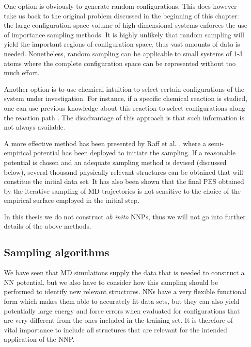 \documentclass[twoside,english]{uiofysmaster}
\begin{document}
One option is obviously to generate random configurations. This does however take us back to the 
original problem discussed in the beginning of this chapter: the large configuration space volume of
high-dimensional systems enforces the use of importance sampling methods. 
It is highly unlikely that random sampling will yield the important regions of configuration space, thus 
vast amounts of data is needed. Nonetheless, random sampling can be applicable to small systems of 1-3 atoms where
the complete configuration space can be represented without too much effort. 

Another option is to use chemical intuition to select certain configurations of 
the system under investigation. 
For instance, if a specific chemical reaction is studied, one can use previous knowledge about this reaction to 
select configurations along the reaction path \cite{Ischtwan94}. The disadvantage of this approach is that
such information is not always available. 

A more effective method has been presented by Raff et al. \cite{Raff05}, where a semi-empirical
potential has been deployed to initiate the sampling. If a reasonable potential is chosen and an adequate
sampling method is devised (discussed below), several thousand physically relevant structures can be obtained
that will constitue the initial data set. It has also been shown \cite{Raff05} that the final PES obtained 
by the iterative sampling of MD trajectories is not sensitive to the choice of the empirical surface employed 
in the initial step. 

In this thesis we do not construct \textit{ab inito} NNPs, thus we will not go into further details
of the above methods. 

\subsection{Sampling algorithms}
We have seen that MD simulations supply the data that is needed to construct a NN potential, but we 
also have to consider how this sampling should be performed to identify new relevant structures.
NNs have a very flexible functional form which makes them able to accurately fit data sets, 
but they can also yield potentially large energy and force errors 
when evaluated for configurations that are very different from the ones included in the training set.
It is therefore of vital importance to include all structures that are relevant for the intended
application of the NNP.
\end{document}
